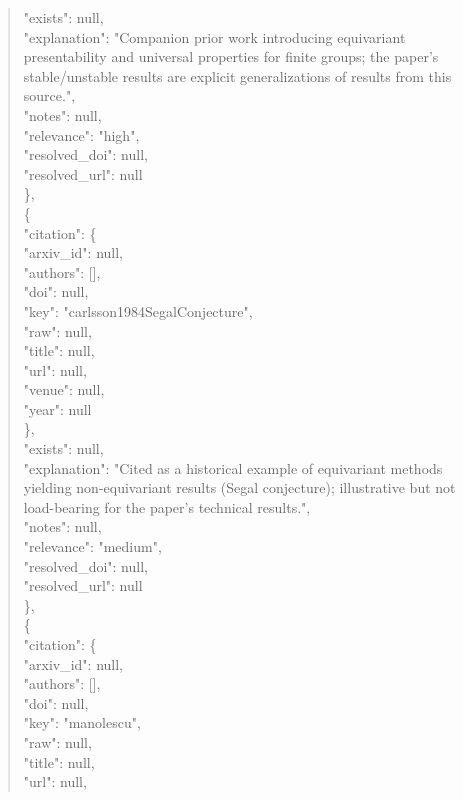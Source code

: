 \documentclass[11pt]{article}
\begin{document}
\begin{quote}
      "exists": null,\\
      "explanation": "Companion prior work introducing equivariant presentability and universal properties for finite groups; the paper's stable/unstable results are explicit generalizations of results from this source.",\\
      "notes": null,\\
      "relevance": "high",\\
      "resolved\_doi": null,\\
      "resolved\_url": null\\
    \},\\
    \{\\
      "citation": \{\\
        "arxiv\_id": null,\\
        "authors": [],\\
        "doi": null,\\
        "key": "carlsson1984SegalConjecture",\\
        "raw": null,\\
        "title": null,\\
        "url": null,\\
        "venue": null,\\
        "year": null\\
      \},\\
      "exists": null,\\
      "explanation": "Cited as a historical example of equivariant methods yielding non-equivariant results (Segal conjecture); illustrative but not load-bearing for the paper's technical results.",\\
      "notes": null,\\
      "relevance": "medium",\\
      "resolved\_doi": null,\\
      "resolved\_url": null\\
    \},\\
    \{\\
      "citation": \{\\
        "arxiv\_id": null,\\
        "authors": [],\\
        "doi": null,\\
        "key": "manolescu",\\
        "raw": null,\\
        "title": null,\\
        "url": null,\\

\end{quote}
\end{document}
